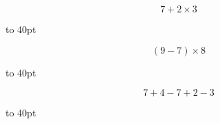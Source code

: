 \documentclass[activite]{thedocument}
\begin{document}
    $$7+2\times3$$\vskip50pt
    \begin{mdframed}\par\vbox to 40pt{}\end{mdframed}
    $$(9-7)\times8$$\vskip50pt
    \begin{mdframed}\par\vbox to 40pt{}\end{mdframed}
    $$7+4-7+2-3$$\vskip50pt
    \begin{mdframed}\par\vbox to 40pt{}\end{mdframed}
\end{document}
